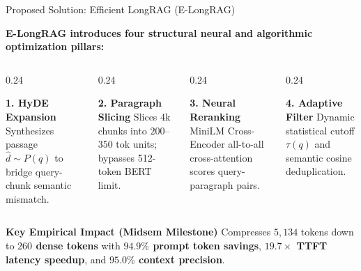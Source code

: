 \documentclass[10pt,aspectratio=169]{beamer}
\begin{document}
\begin{frame}{Proposed Solution: Efficient LongRAG (E-LongRAG)}
    \begin{center}
        \textbf{E-LongRAG introduces four structural neural and algorithmic optimization pillars:}
    \end{center}
    
    \vspace{0.1cm}
    \begin{columns}[onlytextwidth,T]
        \begin{column}{0.24\textwidth}
            \begin{block}{\textbf{1. HyDE Expansion}}
                \scriptsize
                Synthesizes passage $\hat{d} \sim P(q)$ to bridge query-chunk semantic mismatch.
            \end{block}
        \end{column}
        
        \begin{column}{0.24\textwidth}
            \begin{block}{\textbf{2. Paragraph Slicing}}
                \scriptsize
                Slices 4k chunks into $200$--$350$ tok units; bypasses 512-token BERT limit.
            \end{block}
        \end{column}
        
        \begin{column}{0.24\textwidth}
            \begin{block}{\textbf{3. Neural Reranking}}
                \scriptsize
                MiniLM Cross-Encoder all-to-all cross-attention scores query-paragraph pairs.
            \end{block}
        \end{column}

        \begin{column}{0.24\textwidth}
            \begin{block}{\textbf{4. Adaptive Filter}}
                \scriptsize
                Dynamic statistical cutoff $\tau(q)$ and semantic cosine deduplication.
            \end{block}
        \end{column}
    \end{columns}

    \vspace{0.2cm}
    \begin{alertblock}{\textbf{Key Empirical Impact (Midsem Milestone)}}
        \centering
        Compresses $5,134$ tokens down to \textbf{$260$ dense tokens} with \textbf{$94.9\%$ prompt token savings}, \textbf{$19.7\times$ TTFT latency speedup}, and \textbf{$95.0\%$ context precision}.
    \end{alertblock}
\end{frame}
\end{document}
